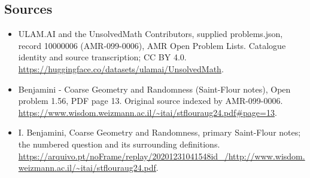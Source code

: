 \documentclass[11pt,a4paper]{article}
\begin{document}
\subsection{Sources}
\begin{itemize}
\item[S1] ULAM.AI and the UnsolvedMath Contributors, supplied problems.json, record 10000006 (AMR-099-0006), AMR Open Problem Lists. Catalogue identity and source transcription; CC BY 4.0.
\url{https://huggingface.co/datasets/ulamai/UnsolvedMath}.
\item[S2] Benjamini - Coarse Geometry and Randomness (Saint-Flour notes), Open problem 1.56, PDF page 13. Original source indexed by AMR-099-0006.
\url{https://www.wisdom.weizmann.ac.il/~itai/stflouraug24.pdf#page=13}.
\item[S3] I. Benjamini, Coarse Geometry and Randomness, primary Saint-Flour notes; the numbered question and its surrounding definitions.
\url{https://arquivo.pt/noFrame/replay/20201231041548id_/http://www.wisdom.weizmann.ac.il/~itai/stflouraug24.pdf}.
\end{itemize}
\end{document}

